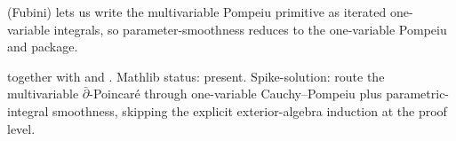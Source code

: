 \begin{lemma}
\label{lem:dpp-r14}
 (Fubini) lets us write the multivariable Pompeiu primitive as iterated one-variable integrals, so parameter-smoothness reduces to the one-variable Pompeiu and  package.
\leanok\mathlibok
\end{lemma}

\begin{lemma}
\label{lem:dpp-r15}
 together with  and .  Mathlib status: present.  Spike-solution: route the multivariable $\bar\partial$-Poincar\'e through one-variable Cauchy--Pompeiu plus parametric-integral smoothness, skipping the explicit exterior-algebra induction at the proof level.
\leanok\mathlibok
\end{lemma}
